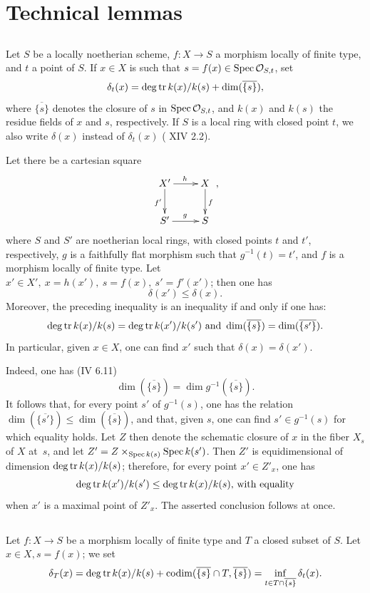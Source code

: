 \section{Technical lemmas} \label{XIV.2}

\subsection{} \label{XIV.2.1}
Let $S$ be a locally noetherian scheme, $f:X\to S$ a morphism locally of finite type, and $t$ a point of $S$. If $x\in X$ is such that $s=f(x)\in\operatorname{Spec}\mathcal O_{S, t}$, set
$$
\delta_t(x)=\operatorname{deg\,tr} k(x)/k(s)+\dim(\overline{\{s\}}),
$$
where $\overline{\{s\}}$ denotes the closure of $s$ in $\operatorname{Spec}\mathcal O_{S, t}$, and $k(x)$ and $k(s)$ the residue fields of $x$ and $s$, respectively. If $S$ is a local ring with closed point $t$, we also write $\delta(x)$ instead of $\delta_t(x)$ (\cf {} XIV 2.2).
\begin{sublemme} \label{XIV.2.1.1} Let there be a cartesian square
$$
\xymatrix{X'\ar[r]^{h}\ar[d]_{f'}&X\ar[d]^f\\S'\ar[r]^g&S},
$$
where $S$ and $S'$ are noetherian local rings, with closed points $t$ and $t'$, respectively, $g$ is a faithfully flat morphism such that $g^{-1}(t)=t'$\pageoriginale, and $f$ is a morphism locally of finite type. Let $x'\in X',\ x=h(x'),\ s=f(x),\ s'=f'(x')$; then one has
$$
\delta(x')\leq\delta(x).
$$
Moreover, the preceding inequality is an inequality if and only if one has:
$$
\operatorname{deg\,tr} k(x)/k(s)=\operatorname{deg\,tr} k(x')/k(s')\text{ and }\dim(\overline{\{s\}})=\dim(\overline{\{s'\}}).
$$
In particular, given $x\in X$, one can find $x'$ such that $\delta(x)=\delta(x')$.
\end{sublemme}

Indeed, one has (\EGA IV 6.11)
$$
\dim(\overline{\{s\}})=\dim g^{-1}(\overline{\{s\}}).
$$
It follows that, for every point $s'$ of $g^{-1}(s)$, one has the relation $\dim(\overline{\{s'\}})\leq \dim(\overline{\{s\}})$, and that, given $s$, one can find $s'\in g^{-1}(s)$ for which equality holds. Let $Z$ then denote the schematic closure of $x$ in the fiber $X_s$ of $X$ at~$s$, and let $Z'=Z\times_{\operatorname{Spec} k(s)}\operatorname{Spec} k(s')$. Then $Z'$ is equidimensional of dimension $\operatorname{deg\,tr} k(x)/k(s)$; therefore, for every point $x'\in Z'_{x}$, one has
$$
\operatorname{deg\,tr} k(x')/k(s')\leq\operatorname{deg\,tr} k(x)/k(s)\text{, with equality}$$
when $x'$ is a maximal point of $Z'_x$. The asserted conclusion follows at once.

\subsection{} \label{XIV.2.2} Let $f:X\to S$ be a morphism locally of finite type and $T$ a closed subset of $S$. Let $x\in X, s=f(x)$; we set
$$
\delta_T(x)=\operatorname{deg\,tr} k(x)/k(s)+\operatorname{codim}(\overline{\{s\}}\cap T, \overline{\{s\}})=\inf_{t\in T\cap\overline{\{s\}}}\delta_t(x).
$$

